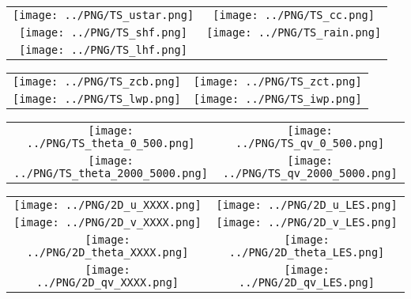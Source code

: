 \documentclass{article}
\begin{document}

\begin{table}
  \begin{tabular}{cc}
    \texttt{[image: ../PNG/TS\_ustar.png]} & \texttt{[image: ../PNG/TS\_cc.png]}   \\ 
    \texttt{[image: ../PNG/TS\_shf.png]}   & \texttt{[image: ../PNG/TS\_rain.png]}  \\
    \texttt{[image: ../PNG/TS\_lhf.png]}   & 
  \end{tabular}
\end{table}

\newpage

\begin{table}
  \begin{tabular}{cc}
    \texttt{[image: ../PNG/TS\_zcb.png]} &  \texttt{[image: ../PNG/TS\_zct.png]} \\
    \texttt{[image: ../PNG/TS\_lwp.png]} &  \texttt{[image: ../PNG/TS\_iwp.png]}
  \end{tabular}
\end{table}

\newpage

\begin{table}
  \begin{tabular}{cc}
    \texttt{[image: ../PNG/TS\_theta\_0\_500.png]}     &  \texttt{[image: ../PNG/TS\_qv\_0\_500.png]} \\
    \texttt{[image: ../PNG/TS\_theta\_2000\_5000.png]} &  \texttt{[image: ../PNG/TS\_qv\_2000\_5000.png]}
  \end{tabular}
\end{table}

\newpage

\begin{table}
  \begin{tabular}{cc}
     \texttt{[image: ../PNG/2D\_u\_XXXX.png]}     & \texttt{[image: ../PNG/2D\_u\_LES.png]}     \\
     \texttt{[image: ../PNG/2D\_v\_XXXX.png]}     & \texttt{[image: ../PNG/2D\_v\_LES.png]}     \\
     \texttt{[image: ../PNG/2D\_theta\_XXXX.png]} & \texttt{[image: ../PNG/2D\_theta\_LES.png]} \\
     \texttt{[image: ../PNG/2D\_qv\_XXXX.png]}    & \texttt{[image: ../PNG/2D\_qv\_LES.png]}
  \end{tabular}
\end{table}
\end{document}
